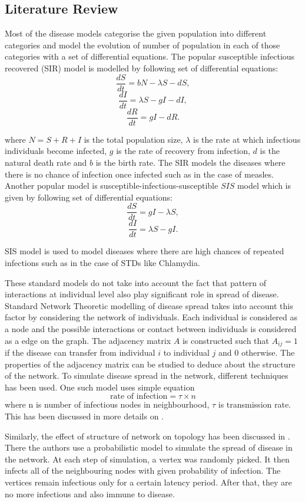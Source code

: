 \documentclass[11pt]{article}
\begin{document}
\subsection{Literature Review}
Most of the disease models categorise the given population into different categories and model the evolution of number of population in each of those categories with a set of differential equations. The popular susceptible infectious recovered (SIR) model is modelled by following set of differential equations:
\[ \frac{dS}{dt} = bN - \lambda S - dS,  \]
\[ \frac{dI}{dt} = \lambda S - gI - dI, \]
\[ \frac{dR}{dt} = gI - dR. \]

where $N = S + R + I$ is the total population size, $\lambda$ is the rate at which infectious individuals become infected, $g$ is the rate of recovery from infection, $d$ is the natural death rate and $b$ is the birth rate. The SIR models the diseases where there is no chance of infection once infected such as in the case of measles. Another popular model is susceptible-infectious-susceptible $SIS$ model which is given by following set of differential equations:
\[ \frac{dS}{dt} = gI - \lambda S,  \]
\[ \frac{dI}{dt} = \lambda S - gI. \]

SIS model is used to model diseases where there are high chances of repeated infections such as in the case of STDs like Chlamydia.

These standard models do not take into account the fact that pattern of interactions at individual level also play significant role in spread of disease. Standard Network Theoretic modelling of disease spread takes into account this factor by considering the network of individuals. Each individual is considered as a node and the possible interactions or contact between individuals is considered as a edge on the graph. The adjacency matrix $A$ is constructed such that $A_{ij} = 1$ if the disease can transfer from individual $i$ to individual $j$ and $0$ otherwise. The properties of the adjacency matrix can be studied to deduce about the structure of the network. To simulate disease spread in the network, different techniques has been used. One such model uses simple equation
\[ \text {rate of infection} = \tau \times n \] where n is number of infectious nodes in neighbourhood, $\tau$ is transmission rate. This has been discussed in more details on \cite{keeling}.

Similarly, the effect of structure of network on topology has been discussed in \cite{shirley}. There the authors use a probabilistic model to simulate the spread of disease in the network. At each step of simulation, a vertex was randomly picked. It then infects all of the neighbouring nodes with given probability of infection. The vertices remain infectious only for a certain latency period. After that, they are no more infectious and also immune to disease.
\end{document}
